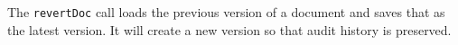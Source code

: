 The \verb+revertDoc+ call loads the previous version of a document and saves
that as the latest version. It will create a new version so that audit
history is preserved.
